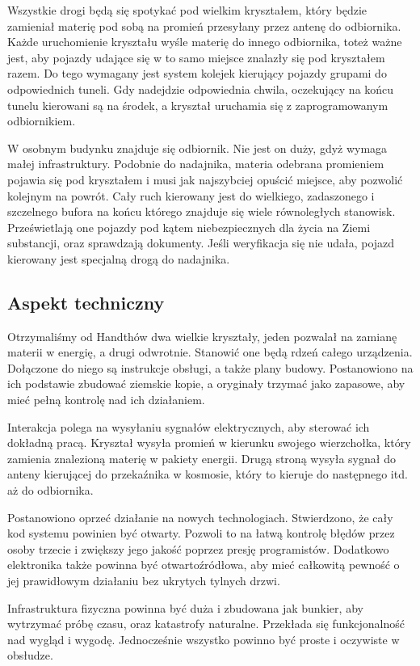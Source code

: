 Wszystkie drogi będą się spotykać pod wielkim kryształem, który będzie zamieniał materię pod sobą na promień przesyłany przez antenę do odbiornika.
Każde uruchomienie kryształu wyśle materię do innego odbiornika, toteż ważne jest, aby pojazdy udające się w to samo miejsce znalazły się pod kryształem razem.
Do tego wymagany jest system kolejek kierujący pojazdy grupami do odpowiednich tuneli.
Gdy nadejdzie odpowiednia chwila, oczekujący na końcu tunelu kierowani są na środek, a kryształ uruchamia się z zaprogramowanym odbiornikiem.

W osobnym budynku znajduje się odbiornik.
Nie jest on duży, gdyż wymaga małej infrastruktury.
Podobnie do nadajnika, materia odebrana promieniem pojawia się pod kryształem i musi jak najszybciej opuścić miejsce, aby pozwolić kolejnym na powrót.
Cały ruch kierowany jest do wielkiego, zadaszonego i szczelnego bufora na końcu którego znajduje się wiele równoległych stanowisk.
Prześwietlają one pojazdy pod kątem niebezpiecznych dla życia na Ziemi substancji, oraz sprawdzają dokumenty.
Jeśli weryfikacja się nie udała, pojazd kierowany jest specjalną drogą do nadajnika.

\subsection{Aspekt techniczny}
Otrzymaliśmy od Handthów dwa wielkie kryształy, jeden pozwalał na zamianę materii w energię, a drugi odwrotnie. 
Stanowić one będą rdzeń całego urządzenia. 
Dołączone do niego są instrukcje obsługi, a także plany budowy.
Postanowiono na ich podstawie zbudować ziemskie kopie, a oryginały trzymać jako zapasowe, aby mieć pełną kontrolę nad ich działaniem.

Interakcja polega na wysyłaniu sygnałów elektrycznych, aby sterować ich dokładną pracą.
Kryształ wysyła promień w kierunku swojego wierzchołka, który zamienia znalezioną materię w pakiety energii.
Drugą stroną wysyła sygnał do anteny kierującej do przekaźnika w kosmosie, który to kieruje do następnego itd. aż do odbiornika.

Postanowiono oprzeć działanie na nowych technologiach.
Stwierdzono, że cały kod systemu powinien być otwarty.
Pozwoli to na łatwą kontrolę błędów przez osoby trzecie i zwiększy jego jakość poprzez presję programistów.
Dodatkowo elektronika także powinna być otwartoźródłowa, aby mieć całkowitą pewność o jej prawidłowym działaniu bez ukrytych tylnych drzwi.

Infrastruktura fizyczna powinna być duża i zbudowana jak bunkier, aby wytrzymać próbę czasu, oraz katastrofy naturalne.
Przekłada się funkcjonalność nad wygląd i wygodę.
Jednocześnie wszystko powinno być proste i oczywiste w obsłudze.

